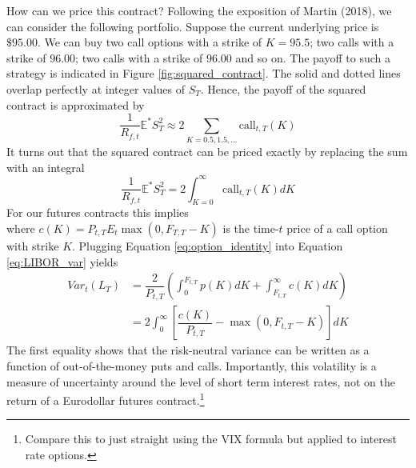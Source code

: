 \documentclass[11pt]{article}
\begin{document}
How can we price this contract? Following the exposition of Martin (2018), we can consider the following portfolio. Suppose the current underlying price is $\$95.00$. We can buy two call options with a strike of $K = 95.5$; two calls with a strike of $96.00$; two calls with a strike of $96.00$ and so on. The payoff to such a strategy is indicated in Figure \ref{fig:squared_contract}. The solid and dotted lines overlap perfectly at integer values of $S_{T}$. Hence, the payoff of the squared contract is approximated by 
\begin{equation*}
\dfrac{1}{R_{f, t}}\mathbb{E}^{*}S_{T}^{2} \approx 2 \sum_{K=0.5, 1.5, ...}\text{call}_{t, T}(K)
\end{equation*}
It turns out that the squared contract can be priced exactly by replacing the sum with an integral
\begin{equation*}
\dfrac{1}{R_{f, t}}\mathbb{E}^{*}S_{T}^{2} = 2 \int_{K=0}^{\infty}\text{call}_{t, T}(K)dK
\end{equation*}
For our futures contracts this implies
\begin{equation}
\label{eq:option_identity}
\end{equation}
where $c(K) = P_{t, T}E_{t}\max(0, F_{T, T}-K)$ is the time-$t$ price of a call option with strike $K$. 
Plugging Equation \ref{eq:option_identity} into Equation \ref{eq:LIBOR_var} yields 
\begin{equation}
\begin{split}
Var_{t}(L_{T}) &= \dfrac{2}{P_{t, T}}\left(\int_{0}^{F_{t, T}}p(K)dK + \int_{F_{t, T}}^{\infty}c(K)dK\right)\\
&=2 \int_{0}^{\infty}\left[\dfrac{c(K)}{P_{t, T}}- \max(0, F_{t, T}-K)\right]dK
\end{split}
\label{eq:oom_expression}
\end{equation}
The first equality shows that the risk-neutral variance can be written as a function of out-of-the-money puts and calls. Importantly, this volatility is a measure of uncertainty around the level of short term interest rates, not on the return of a Eurodollar futures contract.\footnote{Compare this to just straight using the VIX formula but applied to interest rate options.} \\
\end{document}
